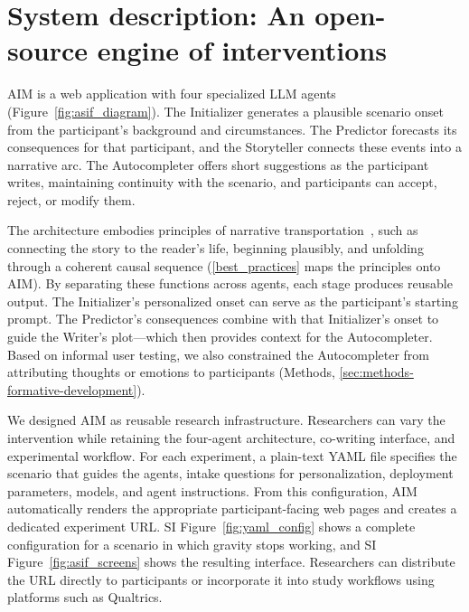 \documentclass[11pt]{article}
\begin{document}
\section{System description: An open-source engine of interventions}
\label{sec:system-description}
\label{sec:aim_system}
\label{sec:aim_architecture}

AIM is a web application with four specialized LLM agents (Figure~\ref{fig:asif_diagram}). The Initializer generates a plausible scenario onset from the participant's background and circumstances. The Predictor forecasts its consequences for that participant, and the Storyteller connects these events into a narrative arc. The Autocompleter offers short suggestions as the participant writes, maintaining continuity with the scenario, and participants can accept, reject, or modify them.

The architecture embodies principles of narrative transportation~\cite{green_transportation_2021}, such as connecting the story to the reader's life, beginning plausibly, and unfolding through a coherent causal sequence (\autoref{best_practices} maps the principles onto AIM).  By separating these functions across agents, each stage produces reusable output. The Initializer’s personalized onset can serve as the participant’s starting prompt.  The Predictor’s consequences combine with that Initializer's onset to guide the Writer’s plot---which then provides context for the Autocompleter. Based on informal user testing, we also constrained the Autocompleter from attributing thoughts or emotions to participants (Methods, \autoref{sec:methods-formative-development}).



\label{sec:intervention_engine}
We designed AIM as reusable research infrastructure. Researchers can vary the intervention while retaining the four-agent architecture, co-writing interface, and experimental workflow. For each experiment, a plain-text YAML file specifies the scenario that guides the agents, intake questions for personalization, deployment parameters, models, and agent instructions. From this configuration, AIM automatically renders the appropriate participant-facing web pages and creates a dedicated experiment URL. SI Figure~\ref{fig:yaml_config} shows a complete configuration for a scenario in which gravity stops working, and SI Figure~\ref{fig:asif_screens} shows the resulting interface. Researchers can distribute the URL directly to participants or incorporate it into study workflows using platforms such as Qualtrics.
\end{document}

